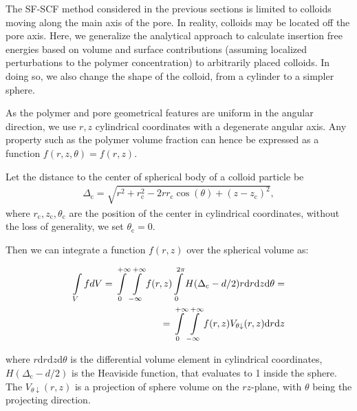\documentclass[10pt, a4paper, twocolumn]{article}
\begin{document}
The SF-SCF method considered in the previous sections is limited to colloids moving along the main axis of the pore.
In reality, colloids may be located off the pore axis.
Here, we generalize the analytical approach to calculate insertion free energies based on volume and surface contributions (assuming localized perturbations to the polymer concentration) to arbitrarily placed colloids.
In doing so, we also change the shape of the colloid, from a cylinder to a simpler sphere.

As the polymer and pore geometrical features are uniform in the angular direction, we use $r, z$ cylindrical coordinates with a degenerate angular axis.
Any property such as the polymer volume fraction can hence be expressed as a function $f(r,z,\theta) = f(r,z)$.

Let the distance to the center of spherical body of a colloid particle be 
\begin{eqnarray}
\Delta_{\text{c}} = \sqrt{r^2 + r_{\text{c}}^2 - 2 r r_{\text{c}} \cos(\theta) + (z - z_{\text{c}})^2},
\end{eqnarray} 
where $r_{\text{c}}, z_{\text{c}}, \theta_{\text{c}}$ are the position of the center in cylindrical coordinates, without the loss of generality, we set $\theta_{\text{c}} = 0$.

Then we can integrate a function $f(r,z)$ over the spherical volume as:

\begin{eqnarray}
    \label{eq:int_indicator_V}
    \begin{aligned}
        \int\limits_{V} f dV
        =\int\displaylimits_{0}^{+\infty} \int\displaylimits_{-\infty}^{+\infty} f(r, z) \int\displaylimits_{0}^{2\pi}  H(\Delta_{\text{c}} - d/2) r \text{d}r \text{d}z \text{d}\theta =\\
        =\int\displaylimits_{0}^{+\infty} \int\displaylimits_{-\infty}^{+\infty} f(r, z)  V_{\theta \downarrow}(r,z) \text{d}r \text{d}z
    \end{aligned}
\end{eqnarray}

where $r \text{d}r \text{d}z \text{d}\theta$ is the differential volume element in cylindrical coordinates, $H(\Delta_{\text{c}} - d/2)$ is the Heaviside function, that evaluates to 1 inside the sphere.
The $V_{\theta \downarrow}(r,z)$ is a projection of sphere volume on the $rz$-plane, with $\theta$ being the projecting direction.
\end{document}
